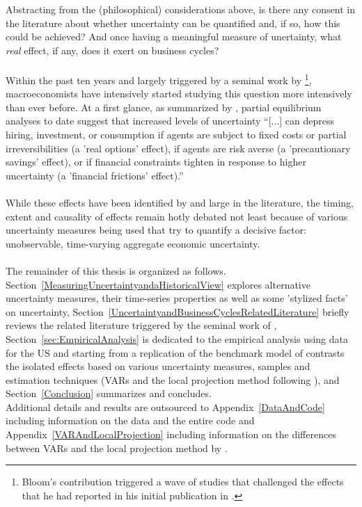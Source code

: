 \documentclass[a4paper,12pt,oneside,pointednumbers,bibtotoc,bigheadings,liststotoc]{scrbook}
\begin{document}
Abstracting from the (philosophical) considerations above, is there any consent in the literature about whether uncertainty can be quantified and, if so, how this could be achieved? And once having a meaningful measure of unertainty, what \textit{real} effect, if any, does it exert on business cycles? \\
\\
Within the past ten years and largely triggered by a seminal work by \citet{bloom:09}\footnote{Bloom's contribution triggered a wave of studies that challenged the effects that he had reported in his initial publication in \citet{bloom:09}.}, macroeconomists have intensively started studying this question more intensively than ever before. At a first glance, as summarized by \citet[p. 1177]{juradoetal:15}, partial equilibrium analyses to date suggest that increased levels of uncertainty ``[...] can depress hiring, investment, or consumption if agents are subject to fixed costs or partial irreversibilities (a 'real options' effect), if agents are risk averse (a 'precautionary savings' effect), or if financial constraints tighten in response to higher uncertainty (a 'financial frictions' effect).'' \\
\\
While these effects have been identified by and large in the literature, the timing, extent and causality of effects remain hotly debated not least because of various uncertainty measures being used that try to quantify a decisive factor: unobservable, time-varying aggregate economic uncertainty.
\\
\\
The remainder of this thesis is organized as follows. Section~\ref{MeasuringUncertaintyandaHistoricalView} explores alternative uncertainty measures, their time-series properties as well as some 'stylized facts' on uncertainty, Section~\ref{UncertaintyandBusinessCyclesRelatedLiterature} briefly reviews the related literature triggered by the seminal work of \citet{bloom:09}, Section~\ref{sec:EmpiricalAnalysis} is dedicated to the empirical analysis using data for the US and starting from a replication of the benchmark model of \citet{bloom:09} contrasts the isolated effects based on various uncertainty measures, samples and estimation techniques (VARs and the local projection method following \citealp{jorda:05}), and Section~\ref{Conclusion} summarizes and concludes. \\
Additional details and results are outsourced to Appendix~\ref{DataAndCode} including information on the data and the entire code and Appendix~\ref{VARAndLocalProjection} including information on the differences between VARs and the local projection method by \citet{jorda:05}.
\end{document}
